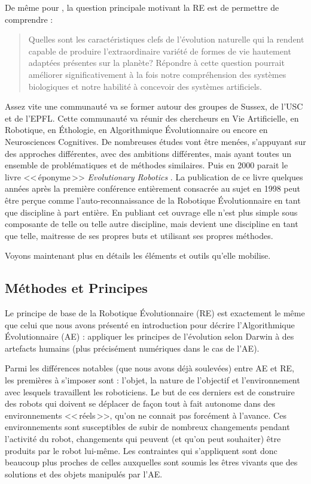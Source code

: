 De même pour \citet[p. 12-13]{nolfi00evolrobobiolintetechselfmach}, la question principale motivant la RE est de permettre de comprendre :
\begin{quotation}
   Quelles sont les caractéristiques clefs de l'évolution naturelle qui la rendent capable de produire l'extraordinaire variété de formes de vie hautement adaptées présentes sur la planète? Répondre à cette question pourrait améliorer significativement à la fois notre compréhension des systèmes biologiques et notre habilité à concevoir des systèmes artificiels.
\end{quotation}

Assez vite une communauté va se former autour des groupes de Sussex, de l'USC et de l'EPFL. Cette communauté va réunir des chercheurs en Vie Artificielle, en Robotique, en \'Ethologie, en Algorithmique \'Evolutionnaire ou encore en Neurosciences Cognitives. De nombreuses études vont être menées, s'appuyant sur des approches différentes, avec des ambitions différentes, mais ayant toutes un ensemble de problématiques et de méthodes similaires. Puis en 2000 parait le livre <<\,éponyme\,>> \emph{Evolutionary Robotics} \citep{nolfi00evolrobobiolintetechselfmach}. La publication de ce livre quelques années après la première conférence entièrement consacrée au sujet en 1998 peut être perçue comme l'auto-reconnaissance de la Robotique \'Evolutionnaire en tant que discipline à part entière. En publiant cet ouvrage elle n'est plus simple sous  composante de telle ou telle autre discipline, mais devient une discipline en tant que telle, maitresse de ses propres buts et utilisant ses propres méthodes.

Voyons maintenant plus en détails les éléments et outils qu'elle mobilise.

\subsection{Méthodes et Principes}
\label{sec:re:meth}

Le principe de base de la Robotique \'Evolutionnaire (RE) est exactement le même que celui que nous avons présenté en introduction pour décrire l'Algorithmique \'Evolutionnaire (AE) : appliquer les principes de l'évolution selon Darwin à des artefacts humains (plus précisément numériques dans le cas de l'AE).

Parmi les différences notables (que nous avons déjà soulevées) entre AE et RE, les premières à s'imposer sont : l'objet, la nature de l'objectif et l'environnement avec lesquels travaillent les roboticiens. Le but de ces derniers est de construire des robots qui doivent se déplacer de façon tout à fait autonome dans des environnements <<\,réels\,>>, qu'on ne connait pas forcément à l'avance. Ces environnements sont susceptibles de subir de nombreux changements pendant l'activité du robot, changements qui peuvent (et qu'on peut souhaiter) être produits par le robot lui-même. Les contraintes qui s'appliquent sont donc beaucoup plus proches de celles auxquelles sont soumis les êtres vivants que des solutions et des objets manipulés par l'AE.

